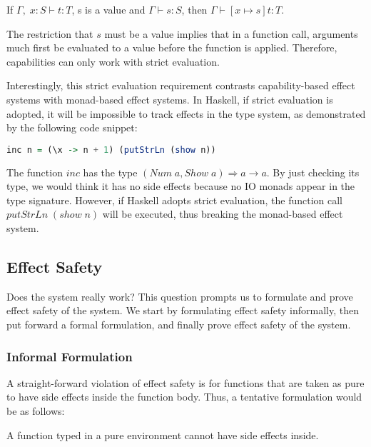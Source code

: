 \begin{lemma}
  If $\Gamma,\; x:S \vdash t : T$, s is a value and
  $\Gamma \vdash s : S$, then $\Gamma \vdash [x \mapsto s]t : T$.
\end{lemma}

The restriction that $s$ must be a value implies that in a function
call, arguments much first be evaluated to a value before the function
is applied. Therefore, capabilities can only work with strict
evaluation.

Interestingly, this strict evaluation requirement contrasts
capability-based effect systems with monad-based effect systems. In
Haskell, if strict evaluation is adopted, it will be impossible to
track effects in the type system, as demonstrated by the following
code snippet:

\begin{lstlisting}[language=Haskell]
  inc n = (\x -> n + 1) (putStrLn (show n))
\end{lstlisting}

The function $inc$ has the type
$(Num\;a, Show\;a) \Rightarrow a \to a$. By just checking its type, we
would think it has no side effects because no IO monads appear in the
type signature. However, if Haskell adopts strict evaluation, the
function call $putStrLn \; (show \; n)$ will be executed, thus
breaking the monad-based effect system.

\subsection{Effect Safety}

Does the system really work? This question prompts us to formulate and
prove effect safety of the system. We start by formulating effect
safety informally, then put forward a formal formulation, and finally
prove effect safety of the system.

\subsubsection{Informal Formulation}

A straight-forward violation of effect safety is for functions that
are taken as pure to have side effects inside the function body. Thus,
a tentative formulation would be as follows:

\begin{definition}
A function typed in a pure environment cannot have side effects inside.
\end{definition}

